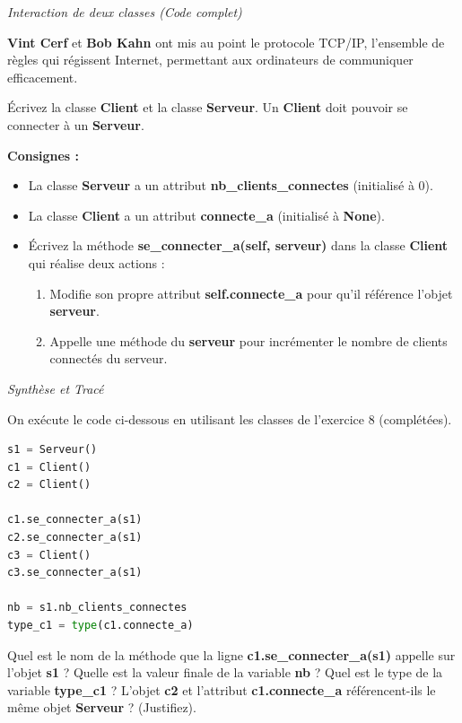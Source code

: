 \begin{Exercise}[title=Le Protocole TCP/IP (Vint Cerf et Bob Kahn)]
\begin{center}
    \textit{Interaction de deux classes (Code complet)}
\end{center}

\textbf{Vint Cerf} et \textbf{Bob Kahn} ont mis au point le protocole TCP/IP, l'ensemble de règles qui régissent Internet, permettant aux ordinateurs de communiquer efficacement.

\Question Écrivez la classe \textbf{Client} et la classe \textbf{Serveur}. Un \textbf{Client} doit pouvoir se connecter à un \textbf{Serveur}.

\textbf{Consignes :}
\begin{itemize}
    \item La classe \textbf{Serveur} a un attribut \textbf{nb\_clients\_connectes} (initialisé à 0).
    \item La classe \textbf{Client} a un attribut \textbf{connecte\_a} (initialisé à \textbf{None}).
    \item Écrivez la méthode \textbf{se\_connecter\_a(self, serveur)} dans la classe \textbf{Client} qui réalise deux actions :
    \begin{enumerate}
        \item Modifie son propre attribut \textbf{self.connecte\_a} pour qu'il référence l'objet \textbf{serveur}.
        \item Appelle une méthode du \textbf{serveur} pour incrémenter le nombre de clients connectés du serveur.
    \end{enumerate}
\end{itemize}
\end{Exercise}

\begin{Exercise}[title=Synthèse et Tracé du Code]
\begin{center}
    \textit{Synthèse et Tracé}
\end{center}

On exécute le code ci-dessous en utilisant les classes de l'exercice 8 (complétées).

\begin{lstlisting}[language=Python]
s1 = Serveur()
c1 = Client()
c2 = Client()

c1.se_connecter_a(s1)
c2.se_connecter_a(s1)
c3 = Client()
c3.se_connecter_a(s1)

nb = s1.nb_clients_connectes
type_c1 = type(c1.connecte_a)
\end{lstlisting}

\Question Quel est le nom de la méthode que la ligne \textbf{c1.se\_connecter\_a(s1)} appelle sur l'objet \textbf{s1} ?
\Question Quelle est la valeur finale de la variable \textbf{nb} ?
\Question Quel est le type de la variable \textbf{type\_c1} ?
\Question L'objet \textbf{c2} et l'attribut \textbf{c1.connecte\_a} référencent-ils le même objet \textbf{Serveur} ? (Justifiez).
\end{Exercise}

